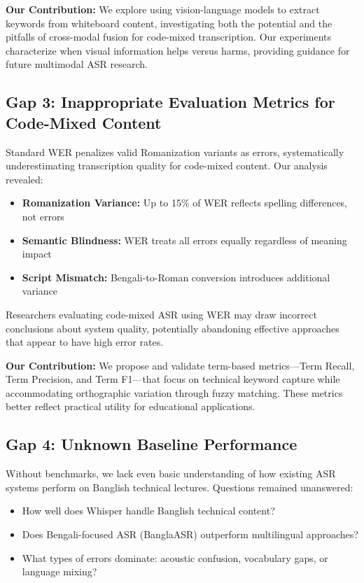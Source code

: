 \textbf{Our Contribution:} We explore using vision-language models to extract keywords from whiteboard content, investigating both the potential and the pitfalls of cross-modal fusion for code-mixed transcription. Our experiments characterize when visual information helps versus harms, providing guidance for future multimodal ASR research.

\subsection{Gap 3: Inappropriate Evaluation Metrics for Code-Mixed Content}

Standard WER penalizes valid Romanization variants as errors, systematically underestimating transcription quality for code-mixed content. Our analysis revealed:

\begin{itemize}
    \item \textbf{Romanization Variance:} Up to 15\% of WER reflects spelling differences, not errors
    \item \textbf{Semantic Blindness:} WER treats all errors equally regardless of meaning impact
    \item \textbf{Script Mismatch:} Bengali-to-Roman conversion introduces additional variance
\end{itemize}

Researchers evaluating code-mixed ASR using WER may draw incorrect conclusions about system quality, potentially abandoning effective approaches that appear to have high error rates.

\textbf{Our Contribution:} We propose and validate term-based metrics---Term Recall, Term Precision, and Term F1---that focus on technical keyword capture while accommodating orthographic variation through fuzzy matching. These metrics better reflect practical utility for educational applications.

\subsection{Gap 4: Unknown Baseline Performance}

Without benchmarks, we lack even basic understanding of how existing ASR systems perform on Banglish technical lectures. Questions remained unanswered:

\begin{itemize}
    \item How well does Whisper handle Banglish technical content?
    \item Does Bengali-focused ASR (BanglaASR) outperform multilingual approaches?
    \item What types of errors dominate: acoustic confusion, vocabulary gaps, or language mixing?
\end{itemize}

